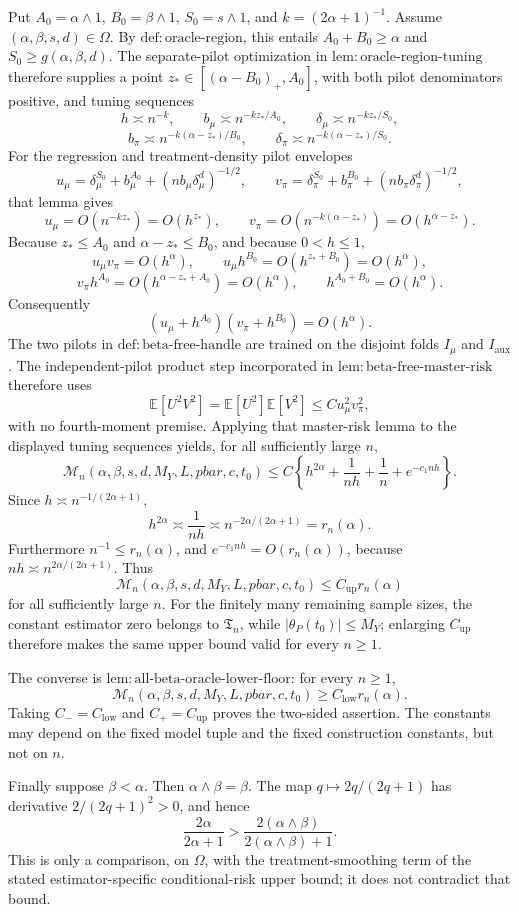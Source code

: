 Put \(A_0=\alpha\wedge1\), \(B_0=\beta\wedge1\), \(S_0=s\wedge1\), and \(k=(2\alpha+1)^{-1}\). Assume \((\alpha,\beta,s,d)\in\Omega\). By \(\mathrm{def:oracle\text{-}region}\), this entails \(A_0+B_0\ge\alpha\) and \(S_0\ge g(\alpha,\beta,d)\). The separate-pilot optimization in \(\mathrm{lem:oracle\text{-}region\text{-}tuning}\) therefore supplies a point \(z_*\in[(\alpha-B_0)_+,A_0]\), with both pilot denominators positive, and tuning sequences
\[
h\asymp n^{-k},\qquad b_\mu\asymp n^{-kz_*/A_0},\qquad \delta_\mu\asymp n^{-kz_*/S_0},
\]
\[
b_\pi\asymp n^{-k(\alpha-z_*)/B_0},\qquad \delta_\pi\asymp n^{-k(\alpha-z_*)/S_0}.
\]
For the regression and treatment-density pilot envelopes
\[
u_\mu=\delta_\mu^{S_0}+b_\mu^{A_0}+(n b_\mu\delta_\mu^d)^{-1/2},
\qquad
v_\pi=\delta_\pi^{S_0}+b_\pi^{B_0}+(n b_\pi\delta_\pi^d)^{-1/2},
\]
that lemma gives
\[
u_\mu=O(n^{-kz_*})=O(h^{z_*}),
\qquad
v_\pi=O(n^{-k(\alpha-z_*)})=O(h^{\alpha-z_*}).
\]
Because \(z_*\le A_0\) and \(\alpha-z_*\le B_0\), and because \(0<h\le1\),
\[
u_\mu v_\pi=O(h^\alpha),\qquad
u_\mu h^{B_0}=O(h^{z_*+B_0})=O(h^\alpha),
\]
\[
v_\pi h^{A_0}=O(h^{\alpha-z_*+A_0})=O(h^\alpha),
\qquad
h^{A_0+B_0}=O(h^\alpha).
\]
Consequently
\[
(u_\mu+h^{A_0})(v_\pi+h^{B_0})=O(h^\alpha).
\]
The two pilots in \(\mathrm{def:beta\text{-}free\text{-}handle}\) are trained on the disjoint folds \(I_\mu\) and \(I_{\mathrm{aux}}\). The independent-pilot product step incorporated in \(\mathrm{lem:beta\text{-}free\text{-}master\text{-}risk}\) therefore uses
\[
\mathbb E[U^2V^2]=\mathbb E[U^2]\mathbb E[V^2]\le C u_\mu^2v_\pi^2,
\]
with no fourth-moment premise. Applying that master-risk lemma to the displayed tuning sequences yields, for all sufficiently large \(n\),
\[
\mathcal M_n(\alpha,\beta,s,d,M_Y,L,pbar,c,t_0)
\le C\left\{h^{2\alpha}+\frac1{nh}+\frac1n+e^{-c_1nh}\right\}.
\]
Since \(h\asymp n^{-1/(2\alpha+1)}\),
\[
h^{2\alpha}\asymp\frac1{nh}\asymp n^{-2\alpha/(2\alpha+1)}=r_n(\alpha).
\]
Furthermore \(n^{-1}\le r_n(\alpha)\), and \(e^{-c_1nh}=O(r_n(\alpha))\), because \(nh\asymp n^{2\alpha/(2\alpha+1)}\). Thus
\[
\mathcal M_n(\alpha,\beta,s,d,M_Y,L,pbar,c,t_0)\le C_{\mathrm{up}}r_n(\alpha)
\]
for all sufficiently large \(n\). For the finitely many remaining sample sizes, the constant estimator zero belongs to \(\mathfrak T_n\), while \(\lvert\theta_P(t_0)\rvert\le M_Y\); enlarging \(C_{\mathrm{up}}\) therefore makes the same upper bound valid for every \(n\ge1\).

The converse is \(\mathrm{lem:all\text{-}beta\text{-}oracle\text{-}lower\text{-}floor}\): for every \(n\ge1\),
\[
\mathcal M_n(\alpha,\beta,s,d,M_Y,L,pbar,c,t_0)
\ge C_{\mathrm{low}}r_n(\alpha).
\]
Taking \(C_-=C_{\mathrm{low}}\) and \(C_+=C_{\mathrm{up}}\) proves the two-sided assertion. The constants may depend on the fixed model tuple and the fixed construction constants, but not on \(n\).

Finally suppose \(\beta<\alpha\). Then \(\alpha\wedge\beta=\beta\). The map \(q\mapsto2q/(2q+1)\) has derivative \(2/(2q+1)^2>0\), and hence
\[
\frac{2\alpha}{2\alpha+1}>\frac{2(\alpha\wedge\beta)}{2(\alpha\wedge\beta)+1}.
\]
This is only a comparison, on \(\Omega\), with the treatment-smoothing term of the stated estimator-specific conditional-risk upper bound; it does not contradict that bound.